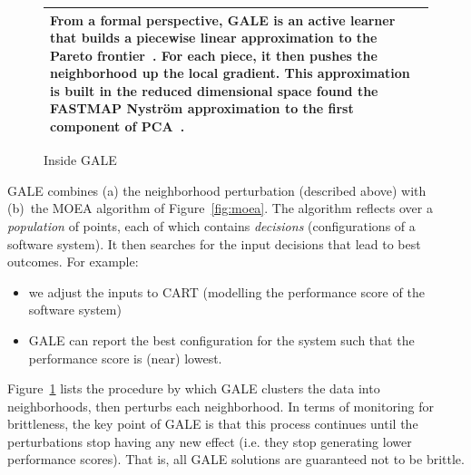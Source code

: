 \documentclass{sig-alternative}
\newcommand{\fig}[1]{Figure~\ref{fig:#1}}
\begin{document}
\begin{figure}[!b]
\begin{tabular}{|p{.95\linewidth}|}
From a formal perspective, GALE is an active learner~\cite{Dasgupta2005} that builds a piecewise linear approximation to the Pareto frontier~\cite{Zuluaga:13}.  For each piece, it then pushes the neighborhood up the local gradient.  This  approximation is built in the reduced dimensional space found the FASTMAP  Nystr\"om approximation to the first component of PCA~\cite{platt05}.
\\\hline
\end{tabular}
\caption{Inside GALE}\label{fig:gale}
\end{figure}
GALE combines (a) the neighborhood perturbation (described above)  with (b)~the MOEA algorithm of \fig{moea}.  The algorithm reflects over a {\em population} of points, each of which contains {\em decisions} (configurations of a software system).  It then searches for the input decisions that lead to best outcomes.  For example:
\begin{itemize}
\item we adjust the inputs to CART (modelling the performance score of the software system)
\item GALE can report the best configuration for the system such that the performance score is (near) lowest.
\end{itemize}

\fig{gale} lists the procedure by which GALE clusters the data into neighborhoods, then perturbs each neighborhood.  In terms of monitoring for brittleness, the key point of GALE is that this process continues until the perturbations stop having any new effect (i.e. they stop generating lower performance scores). That is, all GALE solutions are guaranteed not to be brittle.
\end{document}
